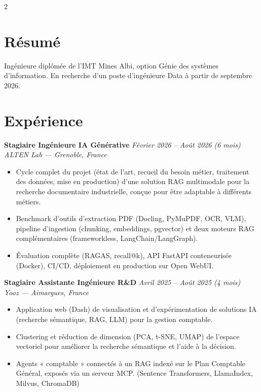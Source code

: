 \documentclass[10.5pt,a4paper]{article}
\newcommand{\sectionrule}{\vspace{-6pt}{\color{accent}\hrule height 1pt}\vspace{3pt}}
\newcommand{\cvexp}[5]{%
  \noindent\textbf{#1} \hfill {\itshape\color{graytext}\small #4}\\
  {\itshape #2 --- #3}\\[-2pt]
  #5
  \vspace{10pt}
}
\begin{document}
\setlength{\columnsep}{1.5em}
\begin{paracol}{2}

\section*{Résumé}
\sectionrule
\justifying
Ingénieure diplômée de l'IMT Mines Albi, option Génie des systèmes d'information. En recherche d'un poste d'ingénieure Data à partir de septembre 2026.

\section*{Expérience}
\sectionrule

\cvexp{Stagiaire Ingénieure IA Générative}{ALTEN Lab}{Grenoble, France}{Février 2026 -- Août 2026 (6 mois)}{%
  \begin{itemize}[leftmargin=12pt, itemsep=2pt, topsep=0pt, partopsep=0pt, parsep=0pt]
    \item Cycle complet du projet (état de l'art, recueil du besoin métier, traitement des données, mise en production) d'une solution RAG multimodale pour la recherche documentaire industrielle, conçue pour être adaptable à différents métiers.
    \item Benchmark d'outils d'extraction PDF (Docling, PyMuPDF, OCR, VLM), pipeline d'ingestion (chunking, embeddings, pgvector) et deux moteurs RAG complémentaires (frameworkless, LangChain/\allowbreak LangGraph).
    \item Évaluation complète (RAGAS, recall@k), API FastAPI conteneurisée (Docker), CI/CD, déploiement en production sur Open WebUI.
  \end{itemize}
}

\cvexp{Stagiaire Assistante Ingénieure R\&D}{Yooz}{Aimargues, France}{Avril 2025 -- Août 2025 (4 mois)}{%
  \begin{itemize}[leftmargin=12pt, itemsep=2pt, topsep=0pt, partopsep=0pt, parsep=0pt]
    \item Application web (Dash) de visualisation et d'expérimentation de solutions IA (recherche sémantique, RAG, LLM) pour la gestion comptable.
    \item Clustering et réduction de dimension (PCA, t-SNE, UMAP) de l'espace vectoriel pour améliorer la recherche sémantique et l'aide à la décision.
    \item Agents « comptable » connectés à un RAG indexé sur le Plan Comptable Général, exposés via un serveur MCP. (Sentence Transformers, LlamaIndex, Milvus, ChromaDB)
  \end{itemize}
}


\end{paracol}
\end{document}
